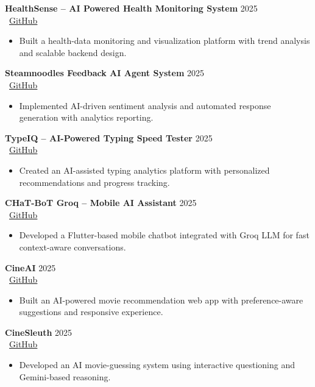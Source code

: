 \documentclass[a4paper,11pt]{article}
\begin{document}
\textbf{HealthSense -- AI Powered Health Monitoring System} \hfill 2025
\\ \faGithub\ \href{https://github.com/lakaThabrew/HealthSense}{GitHub}
\begin{itemize}
    \item Built a health-data monitoring and visualization platform with trend analysis and scalable backend design.
\end{itemize}

\textbf{Steamnoodles Feedback AI Agent System} \hfill 2025
\\ \faGithub\ \href{https://github.com/lakaThabrew/Steamnoodles-Feedback-Agent-LakmanaThabrew}{GitHub}
\begin{itemize}
    \item Implemented AI-driven sentiment analysis and automated response generation with analytics reporting.
\end{itemize}

\textbf{TypeIQ -- AI-Powered Typing Speed Tester} \hfill 2025
\\ \faGithub\ \href{https://github.com/lakaThabrew/ai_typing_Tester}{GitHub}
\begin{itemize}
    \item Created an AI-assisted typing analytics platform with personalized recommendations and progress tracking.
\end{itemize}

\textbf{CHaT-BoT Groq -- Mobile AI Assistant} \hfill 2025
\\ \faGithub\ \href{https://github.com/lakaThabrew/CHaT-BoT_groq}{GitHub}
\begin{itemize}
    \item Developed a Flutter-based mobile chatbot integrated with Groq LLM for fast context-aware conversations.
\end{itemize}

\textbf{CineAI} \hfill 2025
\\ \faGithub\ \href{https://github.com/lakaThabrew/CineAI}{GitHub}
\begin{itemize}
    \item Built an AI-powered movie recommendation web app with preference-aware suggestions and responsive experience.
\end{itemize}

\textbf{CineSleuth} \hfill 2025
\\ \faGithub\ \href{https://github.com/lakaThabrew/Cine-Sleuth}{GitHub}
\begin{itemize}
    \item Developed an AI movie-guessing system using interactive questioning and Gemini-based reasoning.
\end{itemize}
\end{document}
